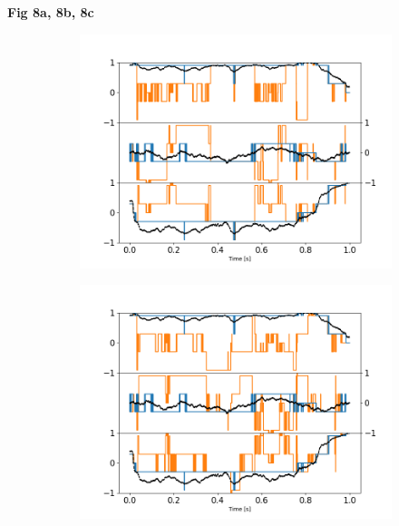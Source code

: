 \documentclass[final,  3p]{elsarticle}
\begin{document}
\begin{center}
	\bf{Fig 8a, 8b, 8c}
\end{center}
\begin{figure}[h]
	\centering
	\begin{subfigure}{0.33\textwidth}
			\subcaption{}
			\includegraphics[width =\textwidth]{./Images/fig8a.png}
	\end{subfigure}
	\begin{subfigure}{0.31\textwidth}
		\subcaption{}
		\includegraphics[width=\textwidth]{./Images/fig8b.png}
	\end{subfigure}
	\begin{subfigure}{0.31\textwidth}
		\subcaption{}

\end{subfigure}
\end{figure}
\end{document}
